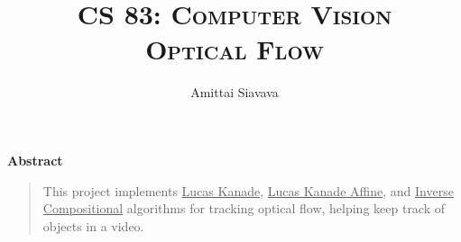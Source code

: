 \title{
  \Huge{\textsc{CS 83: Computer Vision}}\\
  \textsc{Optical Flow}
}

\date{\Large{}}

\begin{titlingpage}

  \author{\Large{Amittai Siavava}}
  \maketitle

  \begin{center} \textbf{Abstract} \end{center}

  
  \begin{quote}
    \small
    
    This project implements \underline{Lucas Kanade},
    \underline{Lucas Kanade Affine}, and \underline{Inverse Compositional}
    algorithms for tracking optical flow, helping keep track of objects
    in a video.

  \end{quote}

  \tableofcontents
  
\end{titlingpage}
